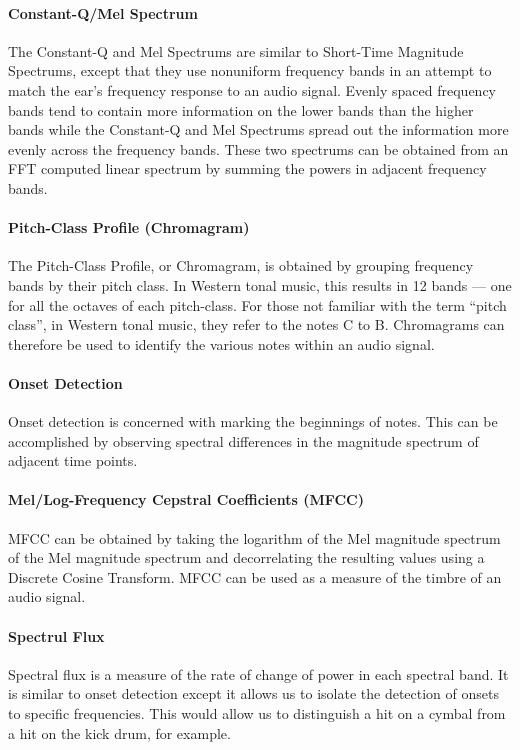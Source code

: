 \documentclass[../initial_thesis.tex]{subfiles}
\begin{document}
\paragraph{Constant-Q/Mel Spectrum}
The Constant-Q and Mel Spectrums are similar to Short-Time Magnitude Spectrums, except that they use nonuniform frequency bands in an attempt to match the ear's frequency response to an audio signal. Evenly spaced frequency bands tend to contain more information on the lower bands than the higher bands while the Constant-Q and Mel Spectrums spread out the information more evenly across the frequency bands. These two spectrums can be obtained from an FFT computed linear spectrum by summing the powers in adjacent frequency bands.

\paragraph{Pitch-Class Profile (Chromagram)}
The Pitch-Class Profile, or Chromagram, is obtained by grouping frequency bands by their pitch class. In Western tonal music, this results in 12 bands --- one for all the octaves of each pitch-class. For those not familiar with the term ``pitch class'', in Western tonal music, they refer to the notes C to B. Chromagrams can therefore be used to identify the various notes within an audio signal.

\paragraph{Onset Detection}
Onset detection is concerned with marking the beginnings of notes. This can be accomplished by observing spectral differences in the magnitude spectrum of adjacent time points.

\paragraph{Mel/Log-Frequency Cepstral Coefficients (MFCC)}
MFCC can be obtained by taking the logarithm of the Mel magnitude spectrum of the Mel magnitude spectrum and decorrelating the resulting values using a Discrete Cosine Transform. MFCC can be used as a measure of the timbre of an audio signal.

\paragraph{Spectrul Flux}
Spectral flux is a measure of the rate of change of power in each spectral band. It is similar to onset detection except it allows us to isolate the detection of onsets to specific frequencies. This would allow us to distinguish a hit on a cymbal from a hit on the kick drum, for example.
\end{document}
